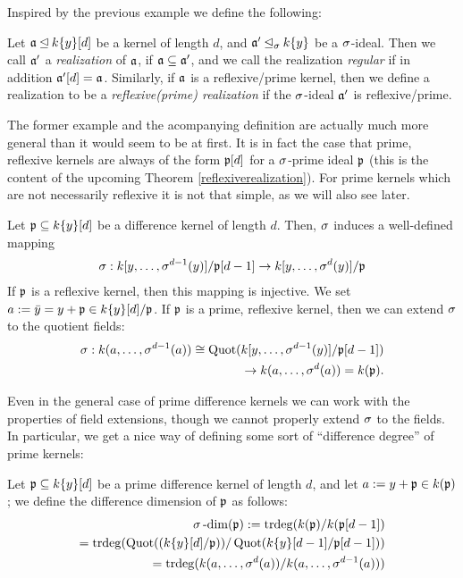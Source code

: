 Inspired by the previous example we define the following:
\begin{defn}
Let $\mathfrak{a} \unlhd k\{y\}[d]$ be a kernel of length $d$, and $\mathfrak{a}' \unlhd_{\sigma} k\{y\}$ be a $\sigma$-ideal. Then we call $\mathfrak{a}'$ a \emph{realization} of $\mathfrak{a}$, if $\mathfrak{a} \subseteq \mathfrak{a}'$, 
and we call the realization \emph{regular}  if in addition $\mathfrak{a}'[d] = \mathfrak{a}$. Similarly, if $\mathfrak{a}$ is a reflexive/prime kernel, then we define a realization to be a \emph{reflexive(prime) realization} if the $\sigma$-ideal $\mathfrak{a}'$ is reflexive/prime.  
\end{defn}

The former example and the acompanying definition are actually much more general than it would seem to be at first. 
It is in fact the case that prime, reflexive kernels are always of the form $\mathfrak{p}[d]$ for a $\sigma$-prime ideal $\mathfrak{p}$ (this is the content of the upcoming Theorem \ref{reflexiverealization}).
For prime kernels which are not necessarily reflexive it is not that simple, as we will also see later. 

\begin{rem}\label{sigmawelldeffker}
Let $\mathfrak{p} \subseteq k\{y\}[d]$ be a difference kernel of length $d$. Then, $\sigma$ induces a well-defined mapping 
\begin{align*}
\sigma: k[y,\ldots,\sigma^{d-1}(y)]/\mathfrak{p}[d-1] \rightarrow k[y,\ldots,\sigma^{d}(y)]/\mathfrak{p}
\end{align*}
If $\mathfrak{p}$ is a reflexive kernel, then this mapping is injective. 
We set $a := \bar y = y + \mathfrak{p} \in k\{y\}[d]/\mathfrak{p}$. If $\mathfrak{p}$ is a prime, reflexive kernel, then we can extend $\sigma$ to the quotient fields:
\begin{align*} \sigma: k(a,\ldots,\sigma^{d-1}(a)) \cong \text{Quot}(k[y,\ldots,\sigma^{d-1}(y)]/\mathfrak{p}[d-1]) \\ \rightarrow k(a,\ldots,\sigma^d(a)) = k(\mathfrak{p}). \end{align*}
\end{rem}

Even in the general case of prime difference kernels we can work with the properties of field extensions, though we cannot properly extend $\sigma$ to the fields.
 In particular, we get a nice way of defining some sort of ``difference degree'' of prime kernels:
\begin{defn}
Let $\mathfrak{p} \subseteq k\{y\}[d]$ be a prime difference kernel of length $d$, and let $a:= y + \mathfrak{p} \in k(\mathfrak{p})$; we define the difference dimension of $\mathfrak{p}$ as follows:
\begin{align*}  \sigma\operatorname{-dim}(\mathfrak{p}) := \operatorname{trdeg}(k(\mathfrak{p})/k(\mathfrak{p}[d-1])  \\ = \operatorname{trdeg}(\operatorname{Quot}((k\{y\}[d]/\mathfrak{p}))/\operatorname{Quot}(k\{y\}[d-1]/\mathfrak{p}[d-1])) \\  = \operatorname{trdeg}(k(a,\ldots,\sigma^{d}(a))/k(a,\ldots,\sigma^{d-1}(a))) \end{align*}
\end{defn}

